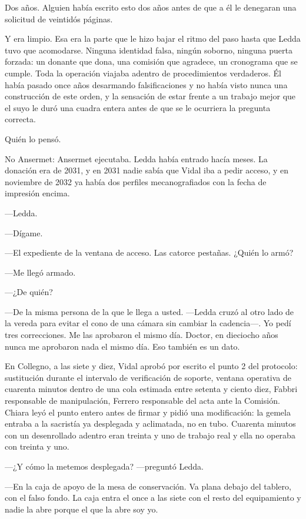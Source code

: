 Dos años. Alguien había escrito esto dos años antes de que a él le denegaran una solicitud de veintidós páginas.

Y era limpio. Esa era la parte que le hizo bajar el ritmo del paso hasta que Ledda tuvo que acomodarse. Ninguna identidad falsa, ningún soborno, ninguna puerta forzada: un donante que dona, una comisión que agradece, un cronograma que se cumple. Toda la operación viajaba adentro de procedimientos verdaderos. Él había pasado once años desarmando falsificaciones y no había visto nunca una construcción de este orden, y la sensación de estar frente a un trabajo mejor que el suyo le duró una cuadra entera antes de que se le ocurriera la pregunta correcta.

Quién lo pensó.

No Ansermet: Ansermet ejecutaba. Ledda había entrado hacía meses. La donación era de 2031, y en 2031 nadie sabía que Vidal iba a pedir acceso, y en noviembre de 2032 ya había dos perfiles mecanografiados con la fecha de impresión encima.

---Ledda.

---Dígame.

---El expediente de la ventana de acceso. Las catorce pestañas. ¿Quién lo armó?

---Me llegó armado.

---¿De quién?

---De la misma persona de la que le llega a usted. ---Ledda cruzó al otro lado de la vereda para evitar el cono de una cámara sin cambiar la cadencia---. Yo pedí tres correcciones. Me las aprobaron el mismo día. Doctor, en dieciocho años nunca me aprobaron nada el mismo día. Eso también es un dato.


\scenebreak


En Collegno, a las siete y diez, Vidal aprobó por escrito el punto 2 del protocolo: sustitución durante el intervalo de verificación de soporte, ventana operativa de cuarenta minutos dentro de una cola estimada entre setenta y ciento diez, Fabbri responsable de manipulación, Ferrero responsable del acta ante la Comisión. Chiara leyó el punto entero antes de firmar y pidió una modificación: la gemela entraba a la sacristía ya desplegada y aclimatada, no en tubo. Cuarenta minutos con un desenrollado adentro eran treinta y uno de trabajo real y ella no operaba con treinta y uno.

---¿Y cómo la metemos desplegada? ---preguntó Ledda.

---En la caja de apoyo de la mesa de conservación. Va plana debajo del tablero, con el falso fondo. La caja entra el once a las siete con el resto del equipamiento y nadie la abre porque el que la abre soy yo.

